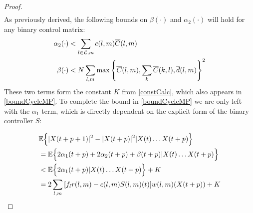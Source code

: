 \begin{proof}
\begin{align*}
 \end{align*}
As previously derived, the following bounds on $\beta(\cdot)$ and $\alpha_2(\cdot)$ will hold for any binary control matrix: 
\begin{align}
\label{a2bound_original} \alpha_2 (\cdot)&<  \sum_{l \in \linkset,m} c(l,m)\overline{C} (l,m) \\ 
\label{bbound_original} \beta (\cdot)  &<  N \displaystyle\sum_{l,m} \max\left\{ \overline{C}(l,m), \sum_{k} \overline{C}(k,l),  \overline d (l,m) \right\}^2
\end{align}
These two terms form the constant $K$ from \eqref{constCalc}, which also appears in \eqref{boundCycleMP}. To complete the bound in  \eqref{boundCycleMP} we are only left with the $\alpha_1$ term, which is directly dependent on the explicit form of the binary controller $S$:

\begin{align}
\nonumber
&\expectation{\vert X(t + p + 1)\vert^2 - \vert X(t + p)\vert^2 \vert X(t) \ldots X(t + p)} \\
\nonumber
& = \expectation{ 2\alpha_{1} (t+p) + 2\alpha_{2}(t+p) +\beta (t+p)    \vert  X(t) \ldots X(t + p)  }\\
\nonumber
&< \expectation{2\alpha_{1} (t+p) \vert X(t) \ldots X(t + p) } + K \\
&= 2\sum_{l,m} {[f_{l}r(l,m) - c(l,m)S(l,m)(t) ]w(l,m)(X(t + p))} + K \label{withK}
\end{align}


\end{proof}
